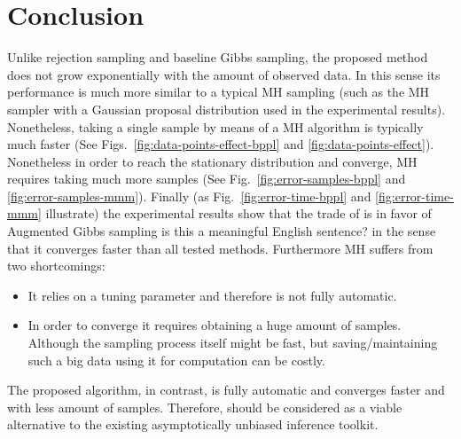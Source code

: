 \section{Conclusion}
Unlike rejection sampling and baseline Gibbs sampling, the proposed method does not grow exponentially with the amount of observed data.
In this sense its performance is much more similar to a typical MH sampling (such as the MH sampler with a Gaussian proposal distribution used in the experimental results).
Nonetheless, taking a single sample by means of a MH algorithm is typically much faster 
(See Figs.~\ref{fig:data-points-effect-bppl} and \ref{fig:data-points-effect}). 
Nonetheless in order to reach the stationary distribution and converge, MH requires taking much more samples (See Fig.~\ref{fig:error-samples-bppl} and \ref{fig:error-samples-mmm}).   
Finally (as Fig.~\ref{fig:error-time-bppl} and \ref{fig:error-time-mmm} illustrate) the experimental results show that the trade of is in favor of Augmented Gibbs sampling
{\color{red} is this a meaningful English sentence?} in the sense that it converges faster than all tested methods.
Furthermore MH suffers from two shortcomings:
\begin{itemize}
\item It relies on a tuning parameter and therefore is not fully automatic.
\item In order to converge it requires obtaining a huge amount of samples.
Although the sampling process itself might be fast, but saving/maintaining such a big data using it for computation can be costly.
\end{itemize}
The proposed algorithm, in contrast, is fully automatic and converges faster and with less amount of samples. Therefore, should be considered as a viable alternative to the existing asymptotically unbiased inference toolkit.



\small{
}



